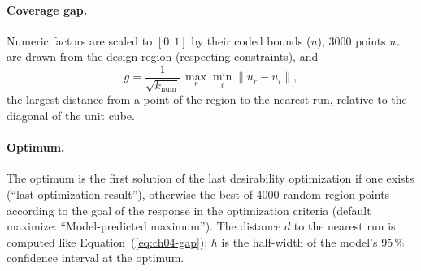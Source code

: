\paragraph{Coverage gap.} Numeric factors are scaled to $[0,1]$ by their coded bounds ($u$), 3000 points $u_r$ are
drawn from the design region (respecting constraints), and
\begin{equation}
g = \frac{1}{\sqrt{k_{\text{num}}}}\, \max_r \min_i \lVert u_r - u_i \rVert ,
\label{eq:ch04-gap}
\end{equation}
the largest distance from a point of the region to the nearest run, relative to the diagonal of the unit cube.

\paragraph{Optimum.} The optimum is the first solution of the last desirability optimization if one exists (``last
optimization result''), otherwise the best of 4000 random region points according to the goal of the response in the
optimization criteria (default maximize: ``Model-predicted maximum''). The distance $d$ to the nearest run is
computed like Equation~(\ref{eq:ch04-gap}); $h$ is the half-width of the model's 95\,\% confidence interval at the
optimum.

